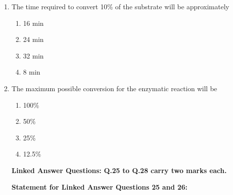 \documentclass[journal,12pt,onecolumn]{IEEEtran}
\begin{document}
\begin{enumerate}
\begin{multicols}{2}
\begin{enumerate}[label=(\Alph*)]
    \item 14 g/l
    \item 26 g/l
    \item 32 g/l
    \item 65 g/l
\end{enumerate}
\end{multicols}

\noindent\textbf{Common Data Questions}

\noindent \textbf{Common Data for Questions 23 and 24:} 

An enzyme (24000~Da) undergoes first-order deactivation kinetics while catalyzing a reaction according to Michaelis–Menten kinetics ($K_m = 10^{-4}$~M). The enzyme has a turnover number of $10^{4}$~molecules-substrate/min/molecule enzyme and a deactivation constant ($k_d$) of 0.1~min$^{-1}$ at the reaction conditions. The reaction mixture initially contains 0.6~mg/l of active enzyme and 0.02~M of the substrate.

\item The time required to convert 10\% of the substrate will be approximately

\begin{multicols}{2}
\begin{enumerate}[label=(\Alph*)]
    \item 16 min
    \item 24 min
    \item 32 min
    \item 8 min
\end{enumerate}
\end{multicols}

\item The maximum possible conversion for the enzymatic reaction will be

\begin{multicols}{2}
\begin{enumerate}[label=(\Alph*)]
    \item 100\%
    \item 50\%
    \item 25\%
    \item 12.5\%
\end{enumerate}
\end{multicols}
\noindent\textbf{Linked Answer Questions: Q.25 to Q.28 carry two marks each.}

\noindent\textbf{Statement for Linked Answer Questions 25 and 26:}  


\end{enumerate}
\end{document}
